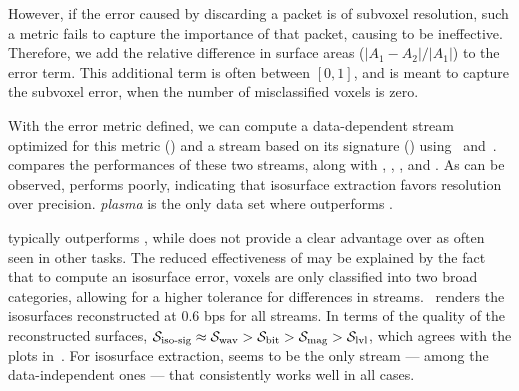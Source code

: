 However, if the error caused by discarding a packet is of subvoxel resolution, such a metric fails
to capture the importance of that packet, causing \siop to be ineffective. Therefore, we add the
relative difference in surface areas ($|A_1-A_2|/|A_1|$) to the error term. This additional term is
often between $[0, 1]$, and is meant to capture the subvoxel error, when the number of misclassified
voxels is zero.

With the error metric defined, we can compute a data-dependent stream optimized for this metric
(\siop) and a stream based on its signature (\sisg) using~
and~.  compares the performances of these two
streams, along with \sbit, \slvl, \swav, and \smag. As can be observed, \slvl performs poorly,
indicating that isosurface extraction favors resolution over precision. \emph{plasma} is the only
data set where \sbit outperforms \swav.

\swav typically outperforms \sbit, while \sisg does not provide a clear advantage over \swav as
often seen in other tasks. The reduced effectiveness of \sisg may be explained by the fact that to
compute an isosurface error, voxels are only classified into two broad categories, allowing for a
higher tolerance for differences in streams.~ renders the
isosurfaces reconstructed at 0.6 bps for all streams. In terms of the quality of the reconstructed
surfaces, $\sisg \approx \swav > \sbit > \smag > \slvl$, which agrees with the plots
in~. For isosurface extraction, \swav seems to be the only stream ---
among the data-independent ones --- that consistently works well in all cases.
